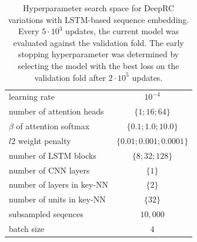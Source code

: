 \documentclass[oneside]{book}
\begin{document}
\begin{table}[htp]%
    \begin{center}%
        \begin{tabular}{lc}%
            \toprule
            learning rate & $10^{-4}$ \\
            number of attention heads & $\{1;16;64\}$ \\
            $\beta$ of attention softmax & $\{0.1;1.0;10.0\}$ \\
            $l2$ weight penalty & $\{0.01;0.001;0.0001\}$ \\
            number of LSTM blocks  & $\{8;32;128\}$ \\
            number of CNN layers & $\{1\}$ \\
            number of layers in key-NN & $\{2\}$ \\
            number of units in key-NN & $\{32\}$ \\
            subsampled seqences & $10,000$ \\
            batch size & $4$ \\
            \bottomrule
        \end{tabular}%
        \caption[Hyperparameter search space for DeepRC variations with LSTM embedding]{Hyperparameter search space for DeepRC variations with LSTM-based sequence embedding.
        Every $5\cdot10^{3}$ updates, the current model was evaluated against the validation fold.
        The early stopping hyperparameter was determined by selecting the model with the best loss
        on the validation fold after $2\cdot10^{5}$ updates.
        }%
        \label{tab:deeprc_variation_settings_lstm}%
    \end{center}%
\end{table}
\end{document}
